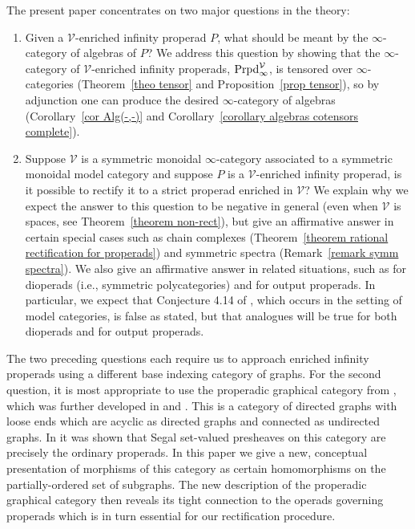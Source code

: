 \documentclass{amsart}
\numberwithin{theorem}{subsection}
\theoremstyle{definition}
\newcommand{\xV}{\mathcal{V}}
\newcommand{\name}[1]{\ensuremath{\text{\textup{#1}}}}
\newcommand{\nmproperad}{\name{Prpd}}
\begin{document}
The present paper concentrates on two major questions in the theory:
\begin{enumerate}
\item 
Given a $\xV$-enriched infinity properad $P$, what should be meant by the $\infty$-category of algebras of $P$? 
We address this question by showing that the $\infty$-category of $\xV$-enriched infinity properads, $\nmproperad_\infty^\xV$, is tensored over $\infty$-categories (Theorem~\ref{theo tensor} and Proposition~\ref{prop tensor}), so by adjunction one can produce the desired $\infty$-category of algebras (Corollary~\ref{cor Alg(-,-)} and Corollary~\ref{corollary algebras cotensors complete}).
\item Suppose $\xV$ is a symmetric monoidal $\infty$-category associated to a symmetric monoidal model category and suppose $P$ is a $\xV$-enriched infinity properad, is it possible to rectify it to a strict properad enriched in $\xV$? 
We explain why we expect the answer to this question to be negative in general (even when $\xV$ is spaces, see Theorem~\ref{theorem non-rect}), but give an affirmative answer in certain special cases such as chain complexes (Theorem~\ref{theorem rational rectification for properads}) and symmetric spectra (Remark~\ref{remark symm spectra}). 
We also give an affirmative answer in related situations, such as for dioperads (i.e., symmetric polycategories) and for output properads. 
In particular, we expect that Conjecture 4.14 of \cite{infproplec}, which occurs in the setting of model categories, is false as stated, but that analogues will be true for both dioperads and for output properads.
\end{enumerate}

The two preceding questions each require us to approach enriched infinity properads using a different base indexing category of graphs.
For the second question, it is most appropriate to use the properadic graphical category from \cite{hrybook}, which was further developed in \cite{Kock_Properads} and \cite{hry_factorizations}. 
This is a category of directed graphs with loose ends which are acyclic as directed graphs and connected as undirected graphs. 
In \cite{hrybook} it was shown that Segal set-valued presheaves on this category are precisely the ordinary properads.
In this paper we give a new, conceptual presentation of morphisms of this category as certain homomorphisms on the partially-ordered set of subgraphs. The new description of the properadic graphical category then reveals its tight connection to the operads governing properads which is in turn essential for our rectification procedure.
\end{document}
